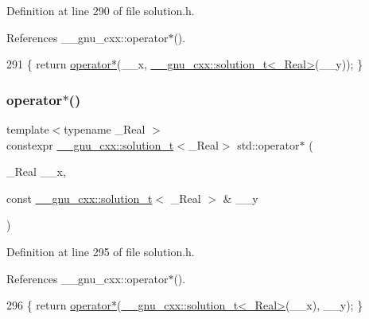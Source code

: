 Definition at line 290 of file solution.\+h.



References \+\_\+\+\_\+gnu\+\_\+cxx\+::operator$\ast$().


\begin{DoxyCode}
291     \{ \textcolor{keywordflow}{return} \hyperlink{namespacestd_ae82d1f9ca11a46b93a33f2f89ce71305}{operator*}(\_\_x, \hyperlink{namespace____gnu__cxx_ae20ea642de50eb361074c62676b0159c}{\_\_gnu\_cxx::solution\_t<\_Real>}(\_\_y)); \}
\end{DoxyCode}
\mbox{\label{namespacestd_ab5d6a3adb4cf1cddc401e0465b832318}} 
\subsubsection{\texorpdfstring{operator$\ast$()}{operator*()}\hspace{0.1cm}{\footnotesize\ttfamily [3/5]}}
{\footnotesize\ttfamily template$<$typename \+\_\+\+Real $>$ \\
constexpr \hyperlink{namespace____gnu__cxx_ae20ea642de50eb361074c62676b0159c}{\+\_\+\+\_\+gnu\+\_\+cxx\+::solution\+\_\+t}$<$\+\_\+\+Real$>$ std\+::operator$\ast$ (\begin{DoxyParamCaption}\item[{\+\_\+\+Real}]{\+\_\+\+\_\+x,  }\item[{const \hyperlink{namespace____gnu__cxx_ae20ea642de50eb361074c62676b0159c}{\+\_\+\+\_\+gnu\+\_\+cxx\+::solution\+\_\+t}$<$ \+\_\+\+Real $>$ \&}]{\+\_\+\+\_\+y }\end{DoxyParamCaption})}



Definition at line 295 of file solution.\+h.



References \+\_\+\+\_\+gnu\+\_\+cxx\+::operator$\ast$().


\begin{DoxyCode}
296     \{ \textcolor{keywordflow}{return} \hyperlink{namespacestd_ae82d1f9ca11a46b93a33f2f89ce71305}{operator*}(\hyperlink{namespace____gnu__cxx_ae20ea642de50eb361074c62676b0159c}{\_\_gnu\_cxx::solution\_t<\_Real>}(\_\_x), \_\_y); \}
\end{DoxyCode}
\mbox{\label{namespacestd_acfa023cb6fb21c4285b73e1728cf340d}} 

